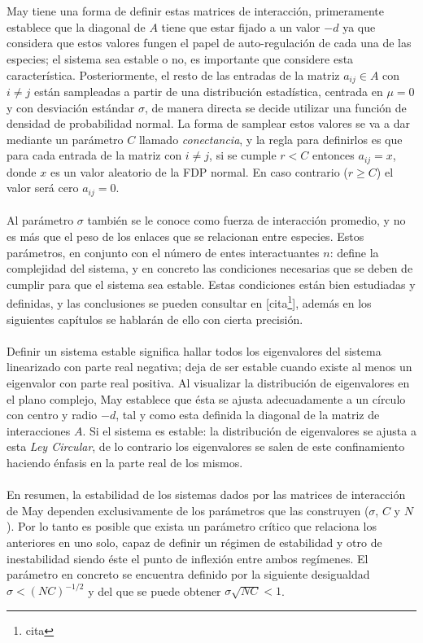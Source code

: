 \\
\\
\setlength{\parindent}{0cm} May tiene una forma de definir estas matrices de interacción, primeramente establece que la diagonal de $A$ tiene que estar fijado a un valor $-d$ ya que considera que estos valores fungen el papel de auto-regulación de cada una de las especies; el sistema sea estable o no, es importante que considere esta característica. Posteriormente, el resto de las entradas de la matriz $a_{ij}\in A$ con $i\neq j$ están sampleadas a partir de una distribución estadística, centrada en $\mu=0$ y con desviación estándar $\sigma$, de manera directa se decide utilizar una función de densidad de probabilidad normal. La forma de samplear estos valores se va a dar mediante un parámetro $C $ llamado \textit{conectancia}, y la regla para definirlos es que para cada entrada de la matriz con $i\neq j$, si se cumple $r<C$ entonces $a_{ij}=x$, donde $x$ es un valor aleatorio de la FDP normal. En caso contrario ($r\geq C$) el valor será cero $ a_{ij}=0$.\\
\\
Al parámetro $\sigma$ también se le conoce como fuerza de interacción promedio, y no es más que el peso de los enlaces que se relacionan entre especies. Estos parámetros, en conjunto con el número de entes interactuantes $n$: define la complejidad del sistema, y en concreto las condiciones necesarias que se deben de cumplir para que el sistema sea estable. Estas condiciones están bien estudiadas y definidas, y las conclusiones se pueden consultar en [cita\footnote{cita}], además en los siguientes capítulos se hablarán de ello con cierta precisión. 
\\
\\
Definir un sistema estable significa hallar todos los eigenvalores del sistema linearizado con parte real negativa; deja de ser estable cuando existe al menos un eigenvalor con parte real positiva. Al visualizar la distribución de eigenvalores en el plano complejo, May establece que ésta se ajusta adecuadamente a un círculo con centro y radio $-d$, tal y como esta definida la diagonal de la matriz de interacciones $A$. Si el sistema es estable: la distribución de eigenvalores se ajusta a esta \textit{Ley Circular}, de lo contrario los eigenvalores se salen de este confinamiento haciendo énfasis en la parte real de los mismos.
\\
\\
En resumen, la estabilidad de los sistemas dados por las matrices de interacción de May dependen exclusivamente de los parámetros que las construyen ($\sigma$, $C$ y $N$). Por lo tanto es posible que exista un parámetro crítico que relaciona los anteriores en uno solo, capaz de definir un régimen de estabilidad y otro de inestabilidad siendo éste el punto de inflexión entre ambos regímenes. El parámetro en concreto se encuentra definido por la siguiente desigualdad $\sigma<(NC)^{-1/2}$ y del que se puede obtener $\sigma\sqrt{NC}<1$. \\
